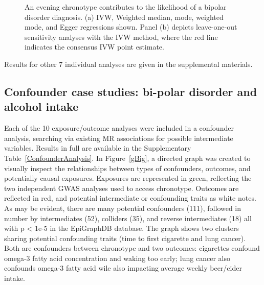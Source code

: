 \documentclass[journal,article,submit,moreauthors,pdftex]{Definitions/mdpi}
\begin{document}
\begin{figure}[htbp]
\begin{subfigure}{.5\linewidth}
\caption{}
\label{bipolarrLoo}
\end{subfigure}
\caption{An evening chronotype contributes to the likelihood of a bipolar disorder diagnosis. (a) IVW, Weighted median, mode, weighted mode, and Egger regressions shown. Panel (b) depicts leave-one-out sensitivity analyses with the IVW method, where the red line indicates the consensus IVW point estimate.}
\label{bipolar}
\end{figure}

Results for other 7 individual analyses are given in the supplemental materials.


\subsection{Confounder case studies: bi-polar disorder and alcohol intake}
Each of the 10 exposure/outcome analyses were included in a confounder analysis, searching via existing MR associations for possible intermediate variables. Results in full are available in the Supplementary Table~\ref{ConfounderAnalysis}. In Figure~\ref{gBig}, a directed graph was created to visually inspect the relationships between types of confounders, outcomes, and potentially causal exposures. Exposures are represented in green, reflecting the two independent GWAS analyses used to access chronotype. Outcomes are reflected in red, and potential intermediate or confounding traits as white notes. As may be evident, there are many potential confounders (111), followed in number by intermediates (52), colliders (35), and reverse intermediates (18) all with p < 1e-5 in the EpiGraphDB database. The graph shows two clusters sharing potential confounding traits (time to first cigarette and lung cancer). Both are confounders between chronotype and two outcomes: cigarettes confound omega-3 fatty acid concentration and waking too early; lung cancer also confounds omega-3 fatty acid wile also impacting average weekly beer/cider intake.
\end{document}

